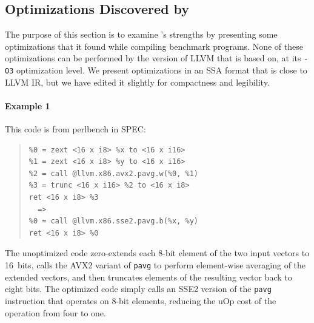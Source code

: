 \subsection{Optimizations Discovered by \minotaur}
\label{sec:examples}

The purpose of this section is to examine \minotaur's strengths by
presenting some optimizations that it found while compiling benchmark
programs.
%
None of these optimizations can be performed by the version of LLVM
that \minotaur{} is based on,
at its \texttt{-O3} optimization level.
%
We present optimizations in an SSA format that is close to LLVM IR,
but we have edited it slightly for compactness and legibility.

\paragraph*{Example 1}

This code is from perlbench in SPEC:

{\begin{quote}\begin{verbatim}
%0 = zext <16 x i8> %x to <16 x i16>
%1 = zext <16 x i8> %y to <16 x i16>
%2 = call @llvm.x86.avx2.pavg.w(%0, %1)
%3 = trunc <16 x i16> %2 to <16 x i8>
ret <16 x i8> %3
  =>
%0 = call @llvm.x86.sse2.pavg.b(%x, %y)
ret <16 x i8> %0
\end{verbatim}
\end{quote}}

The unoptimized code zero-extends each 8-bit element of the two input
vectors to 16~bits, calls the AVX2 variant of \texttt{pavg} to perform
element-wise averaging of the extended vectors, and then truncates
elements of the resulting vector back to eight bits.
%
The optimized code simply calls an SSE2 version of the \texttt{pavg}
instruction that operates on 8-bit elements, reducing the uOp cost
of the operation from four to one.


